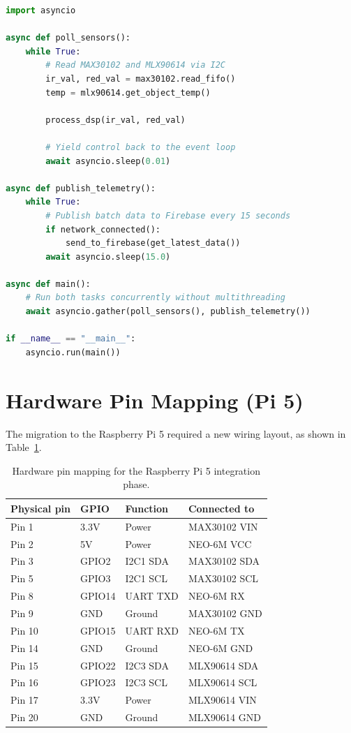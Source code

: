 \documentclass[12pt,a4paper,oneside]{report}
\begin{document}
\begin{lstlisting}[language=Python, caption=Simplified Python asyncio loop for non-blocking sensor polling on the Raspberry Pi 5.]
import asyncio

async def poll_sensors():
    while True:
        # Read MAX30102 and MLX90614 via I2C
        ir_val, red_val = max30102.read_fifo()
        temp = mlx90614.get_object_temp()
        
        process_dsp(ir_val, red_val)
        
        # Yield control back to the event loop
        await asyncio.sleep(0.01) 

async def publish_telemetry():
    while True:
        # Publish batch data to Firebase every 15 seconds
        if network_connected():
            send_to_firebase(get_latest_data())
        await asyncio.sleep(15.0)

async def main():
    # Run both tasks concurrently without multithreading
    await asyncio.gather(poll_sensors(), publish_telemetry())

if __name__ == "__main__":
    asyncio.run(main())
\end{lstlisting}

\section{Hardware Pin Mapping (Pi 5)}
The migration to the Raspberry Pi 5 required a new wiring layout, as shown in Table~\ref{tab:pi5_pins}. 

\begin{table}[H]
\centering
\begin{tabular}{@{}llll@{}}
\toprule
\textbf{Physical pin} & \textbf{GPIO} & \textbf{Function} & \textbf{Connected to} \\ \midrule
Pin 1  & 3.3V   & Power    & MAX30102 VIN \\
Pin 2  & 5V     & Power    & NEO-6M VCC   \\
Pin 3  & GPIO2  & I2C1 SDA & MAX30102 SDA \\
Pin 5  & GPIO3  & I2C1 SCL & MAX30102 SCL \\
Pin 8  & GPIO14 & UART TXD & NEO-6M RX    \\
Pin 9  & GND    & Ground   & MAX30102 GND \\
Pin 10 & GPIO15 & UART RXD & NEO-6M TX    \\
Pin 14 & GND    & Ground   & NEO-6M GND   \\
Pin 15 & GPIO22 & I2C3 SDA & MLX90614 SDA \\
Pin 16 & GPIO23 & I2C3 SCL & MLX90614 SCL \\
Pin 17 & 3.3V   & Power    & MLX90614 VIN \\
Pin 20 & GND    & Ground   & MLX90614 GND \\ \bottomrule
\end{tabular}
\caption{Hardware pin mapping for the Raspberry Pi 5 integration phase.}
\label{tab:pi5_pins}
\end{table}
\end{document}
